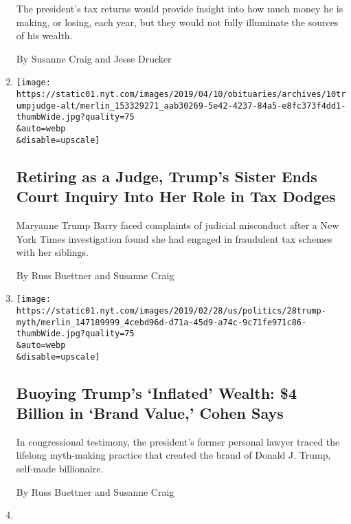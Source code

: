 \begin{enumerate}
  The president's tax returns would provide insight into how much money
  he is making, or losing, each year, but they would not fully
  illuminate the sources of his wealth.

  By Susanne Craig and Jesse Drucker
\item
  \href{/2019/04/10/us/maryanne-trump-barry-misconduct-inquiry.html}{}

  \texttt{[image: https://static01.nyt.com/images/2019/04/10/obituaries/archives/10trumpjudge-alt/merlin\_153329271\_aab30269-5e42-4237-84a5-e8fc373f4dd1-thumbWide.jpg?quality=75\\\&auto=webp\\\&disable=upscale]}

  \hypertarget{retiring-as-a-judge-trumps-sister-ends-court-inquiry-into-her-role-in-tax-dodges}{%
  \subsection{Retiring as a Judge, Trump's Sister Ends Court Inquiry
  Into Her Role in Tax
  Dodges}\label{retiring-as-a-judge-trumps-sister-ends-court-inquiry-into-her-role-in-tax-dodges}}

  Maryanne Trump Barry faced complaints of judicial misconduct after a
  New York Times investigation found she had engaged in fraudulent tax
  schemes with her siblings.

  By Russ Buettner and Susanne Craig
\item
  \href{/2019/02/27/us/politics/donald-trump-wealth.html}{}

  \texttt{[image: https://static01.nyt.com/images/2019/02/28/us/politics/28trump-myth/merlin\_147189999\_4cebd96d-d71a-45d9-a74c-9c71fe971c86-thumbWide.jpg?quality=75\\\&auto=webp\\\&disable=upscale]}

  \hypertarget{buoying-trumps-inflated-wealth-4-billion-in-brand-value-cohen-says}{%
  \subsection{Buoying Trump's `Inflated' Wealth: \$4 Billion in `Brand
  Value,' Cohen
  Says}\label{buoying-trumps-inflated-wealth-4-billion-in-brand-value-cohen-says}}

  In congressional testimony, the president's former personal lawyer
  traced the lifelong myth-making practice that created the brand of
  Donald J. Trump, self-made billionaire.

  By Russ Buettner and Susanne Craig
\item
  \href{/2019/02/02/business/trump-deutsche-bank.html}{}


\end{enumerate}
